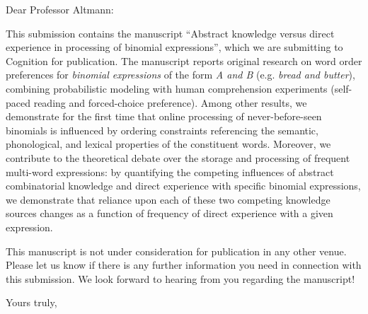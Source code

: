 \documentclass[12pt]{letter}
\begin{document}
\begin{letter}{
}



\opening{Dear Professor Altmann:}

This submission contains the manuscript ``Abstract knowledge versus direct experience in processing of binomial expressions'', which we are submitting to
Cognition for publication.
The manuscript reports original research on word order preferences for \emph{binomial expressions} of the form \emph{A and B} (e.g. \emph{bread and butter}), combining probabilistic modeling with human comprehension experiments (self-paced reading and forced-choice preference). Among other results, we demonstrate for the first time that online processing of never-before-seen binomials is influenced by ordering constraints referencing the semantic, phonological, and lexical properties of the constituent words. Moreover, we contribute to the theoretical debate over the storage and processing of frequent multi-word expressions: by quantifying the competing influences of abstract combinatorial knowledge and direct experience with specific binomial expressions, we demonstrate that reliance upon each of these two competing knowledge sources changes as a function of frequency of direct experience with a given expression.


This manuscript is not under consideration for publication in any
other venue.  Please let us know if there is any further information
you need in connection with this submission.  We look forward to
hearing from you regarding the manuscript!  \closing{Yours truly,}

\end{letter}
\end{document}
